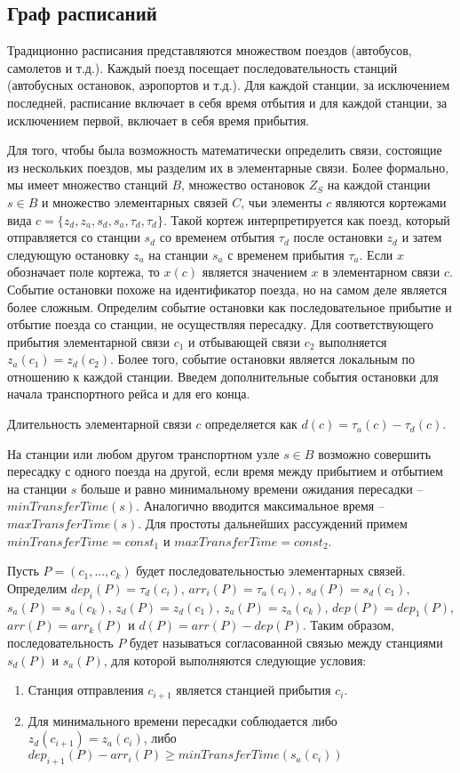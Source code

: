 \subsection{Граф расписаний}
Традиционно расписания представляются множеством поездов (автобусов, самолетов и т.д.). Каждый поезд посещает последовательность станций (автобусных остановок, аэропортов и т.д.). Для каждой станции, за исключением последней, расписание включает в себя время отбытия и для каждой станции, за исключением первой, включает в себя время прибытия.

Для того, чтобы была возможность математически определить связи, состоящие из нескольких поездов, мы разделим их в элементарные связи. Более формально, мы имеет множество станций $B$, множество остановок $Z_S$ на каждой станции $s \in B$ и множество элементарных связей $C$, чьи элементы $c$ являются кортежами вида $c=\{z_d,z_a,s_d,s_a,\tau_d,\tau_d\}$. Такой кортеж интерпретируется как поезд, который отправляется со станции $s_d$ со временем отбытия $\tau_d$ после остановки $z_d$ и затем следующую остановку $z_a$ на станции $s_a$ с временем прибытия $\tau_a$. Если $x$ обозначает поле кортежа, то $x(c)$ является значением $x$ в элементарном связи $c$. Событие остановки похоже на идентификатор поезда, но на самом деле является более сложным. Определим событие остановки как последовательное прибытие и отбытие поезда со станции, не осуществляя пересадку. Для соответствующего прибытия элементарной связи $c_1$ и отбывающей связи $c_2$ выполняется $z_a(c_1)=z_d(c_2)$. Более того, событие остановки является локальным по отношению к каждой станции. Введем дополнительные события остановки для начала транспортного рейса и для его конца.

\begin{definition}
	Длительность элементарной связи $c$ определяется как $d(c)=\tau_a(c)-\tau_d(c)$.
\end{definition}

На станции или любом другом транспортном узле $s \in B$ возможно совершить пересадку с одного поезда на другой, если время между прибытием и отбытием на станции $s$ больше и равно минимальному времени ожидания пересадки -- $minTransferTime(s)$. Аналогично вводится максимальное время -- $maxTransferTime(s)$. Для простоты дальнейших рассуждений примем $minTransferTime = const_1$ и $maxTransferTime = const_2$.

Пусть $P=(c_1, ..., c_k)$ будет последовательностью элементарных связей. Определим $dep_i(P)=\tau_d(c_i)$, $arr_i(P)=\tau_a(c_i)$, $s_d(P)=s_d(c_1)$, $s_a(P)=s_a(c_k)$, $z_d(P)=z_d(c_1)$, $z_a(P)=z_a(c_k)$, $dep(P)=dep_1(P)$, $arr(P)=arr_k(P)$ и $d(P)=arr(P)-dep(P)$. Таким образом, последовательность $P$ будет называться согласованной связью между станциями $s_d(P)$ и $s_a(P)$, для которой выполняются следующие условия:
\begin{enumerate}
	\item Станция отправления $c_{i+1}$ является станцией прибытия $c_i$.
	\item Для минимального времени пересадки соблюдается либо $z_d(c_{i+1})=z_a(c_i)$, либо $dep_{i+1}(P)-arr_i(P) \geqslant minTransferTime(s_a(c_i))$ 
\end{enumerate}

